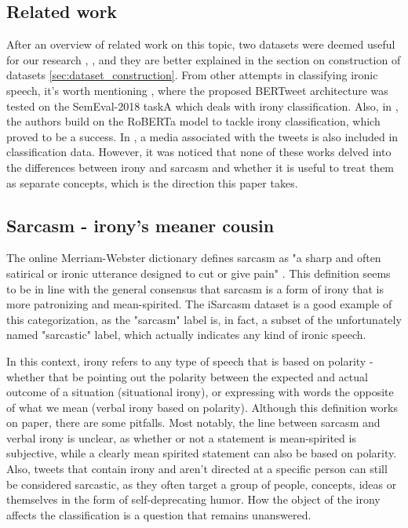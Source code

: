 \documentclass[10pt, a4paper]{article}
\begin{document}
\subsection{Related work}
After an overview of related work on this topic, two datasets were deemed useful for our research \citep{iSarcasm}, \citep{semeval-2018},
and they are better explained in the section on construction of datasets \ref{sec:dataset_construction}. From other attempts in classifying 
ironic speech, it's worth mentioning \citep{bertweet}, where the proposed BERTweet architecture was tested on the SemEval-2018 taskA which 
deals with irony classification. Also, in \citep{transformers4irony-2020}, the authors build on the RoBERTa \citep{roberta} model to tackle 
irony classification, which proved to be a success. In \citep{transformers4irony-2023}, a media associated with the tweets is also included 
in classification data. However, it was noticed that none of these works delved into the differences between irony and sarcasm and whether it 
is useful to treat them as separate concepts, which is the direction this paper takes.
 
 
\subsection{Sarcasm - irony's meaner cousin}\label{sec:sarcasm_definition}
The online Merriam-Webster dictionary defines sarcasm as "a sharp and often satirical or ironic utterance designed to 
cut or give pain" \citep{mw-dictionary}. This definition seems to be in line with the general consensus that sarcasm is
a form of irony that is more patronizing and mean-spirited. The iSarcasm dataset \citep{iSarcasm} is a good example of this 
categorization, as the "sarcasm" label is, in fact, a subset of the unfortunately named "sarcastic" label, which actually 
indicates any kind of ironic speech. 

In this context, irony refers to any type of speech that is based on polarity - whether that be pointing out the polarity 
between the expected and actual outcome of a situation (situational irony), or expressing with words the opposite of what 
we mean (verbal irony based on polarity). Although this definition works on paper, there are some pitfalls. Most notably, 
the line between sarcasm and verbal irony is unclear, as whether or not a statement is mean-spirited is subjective, while 
a clearly mean spirited statement can also be based on polarity. Also, tweets that contain irony and aren’t directed at a 
specific person can still be considered sarcastic, as they often target a group of people, concepts, ideas or themselves 
in the form of self-deprecating humor. How the object of the irony affects the classification is a question that remains unanswered.
\end{document}
